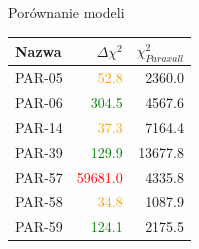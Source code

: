 \documentclass{beamer}
\begin{document}
\begin{frame}{Porównanie modeli}
    \begin{table}[h]
        \centering
        \begin{tabularx}{\linewidth}{X r r}
            \toprule
            Nazwa  & $\Delta\chi^2$           & $\chi^2 _{Paraxall}$ \\
            \midrule
            PAR-05 & \textcolor{orange}{52.8} & 2360.0               \\
            PAR-06 & \textcolor{green}{304.5} & 4567.6               \\
            PAR-14 & \textcolor{orange}{37.3} & 7164.4               \\
            PAR-39 & \textcolor{green}{129.9} & 13677.8              \\
            PAR-57 & \textcolor{red}{59681.0} & 4335.8               \\
            PAR-58 & \textcolor{orange}{34.8} & 1087.9               \\
            PAR-59 & \textcolor{green}{124.1} & 2175.5               \\
            \bottomrule
        \end{tabularx}
    \end{table}

\end{frame}
\end{document}
